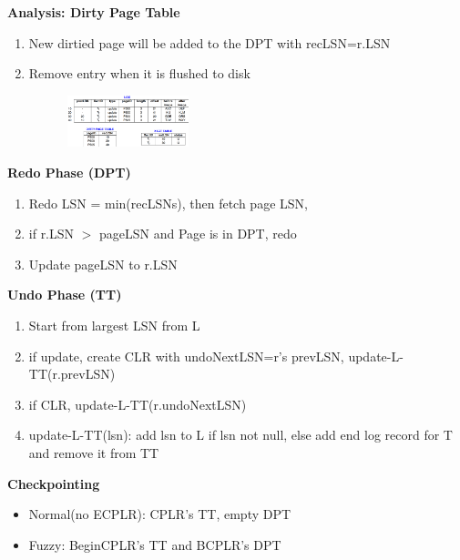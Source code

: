 \documentclass[10pt, landscape]{article}
\begin{document}
\begin{multicols}{4}
\textbf{Analysis: Dirty Page Table} \\
\begin{enumerate}
  \item New dirtied page will be added to the DPT with recLSN=r.LSN
  \item Remove entry when it is flushed to disk
\end{enumerate}

\includegraphics[width=7cm, height =1.5cm]{analysis_log.png}

\textbf{Redo Phase (DPT)} \\
\begin{enumerate}
  \item Redo LSN = min(recLSNs), then fetch page LSN, 
  \item if r.LSN $>$ pageLSN and Page is in DPT, redo
  \item Update pageLSN to r.LSN
\end{enumerate}

\textbf{Undo Phase (TT)} \\
\begin{enumerate}
  \item Start from largest LSN from L
  \item if update, create CLR with undoNextLSN=r's prevLSN, update-L-TT(r.prevLSN)
  \item if CLR, update-L-TT(r.undoNextLSN)
  \item update-L-TT(lsn): add lsn to L if lsn not null, else add end log record for T and remove it from TT
\end{enumerate}

\textbf{Checkpointing} \\
\begin{itemize}
  \item Normal(no ECPLR): CPLR's TT, empty DPT
  \item Fuzzy: BeginCPLR's TT and BCPLR's DPT  
\end{itemize}

\end{multicols}
\end{document}
